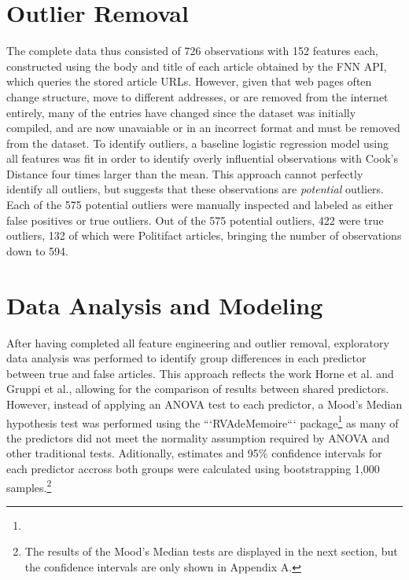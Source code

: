 \documentclass[../thesis.tex]{subfiles}
\begin{document}
\section{Outlier Removal}

The complete data thus consisted of 726 observations with 152 features each, constructed using the body and title of each article obtained by the FNN API, which queries the stored article URLs. However, given that web pages often change structure, move to different addresses, or are removed from the internet entirely, many of the entries have changed since the dataset was initially compiled, and are now unavaiable or in an incorrect format and must be removed from the dataset. To identify outliers, a baseline logistic regression model using all features was fit in order to identify overly influential observations with Cook's Distance four times larger than the mean. This approach cannot perfectly identify all outliers, but suggests that these observations are \emph{potential} outliers. Each of the 575 potential outliers were manually inspected and labeled as either false positives or true outliers. Out of the 575 potential outliers, 422 were true outliers, 132 of which were Politifact articles, bringing the number of observations down to 594.

\section{Data Analysis and Modeling}

After having completed all feature engineering and outlier removal, exploratory data analysis was performed to identify group differences in each predictor between true and false articles. This approach reflects the work Horne et al. and Gruppi et al., allowing for the comparison of results between shared predictors. However, instead of applying an ANOVA test to each predictor, a Mood's Median hypothesis test was performed using the ```RVAdeMemoire``` package\footnote{} as many of the predictors did not meet the normality assumption required by ANOVA and other traditional tests. Aditionally, estimates and 95\% confidence intervals for each predictor accross both groups were calculated using bootstrapping 1,000 samples.\footnote{The results of the Mood's Median tests are displayed in the next section, but the confidence intervals are only shown in Appendix A.}
\end{document}
